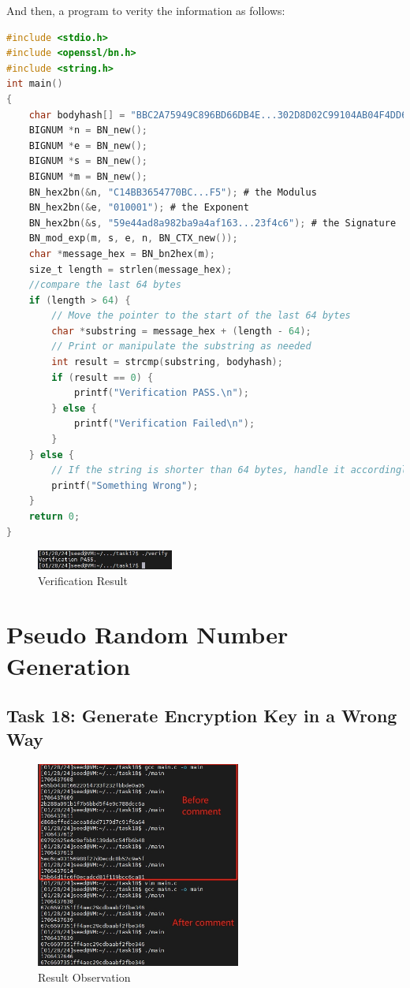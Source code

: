\documentclass[a4paper,11pt]{article}
\begin{document}
And then, a program to verity the information as follows:
\begin{lstlisting}[caption={C Program Code for Manually Verifying},label={lst:task17},language=C,breaklines=true]
#include <stdio.h>
#include <openssl/bn.h>
#include <string.h>
int main()
{
    char bodyhash[] = "BBC2A75949C896BD66DB4E...302D8D02C99104AB04F4DD6"; # the Body HASH
    BIGNUM *n = BN_new();
    BIGNUM *e = BN_new();
    BIGNUM *s = BN_new();
    BIGNUM *m = BN_new();
    BN_hex2bn(&n, "C14BB3654770BC...F5"); # the Modulus
    BN_hex2bn(&e, "010001"); # the Exponent
    BN_hex2bn(&s, "59e44ad8a982ba9a4af163...23f4c6"); # the Signature
    BN_mod_exp(m, s, e, n, BN_CTX_new());
    char *message_hex = BN_bn2hex(m);
    size_t length = strlen(message_hex);
    //compare the last 64 bytes
    if (length > 64) {
        // Move the pointer to the start of the last 64 bytes
        char *substring = message_hex + (length - 64);
        // Print or manipulate the substring as needed
        int result = strcmp(substring, bodyhash);
        if (result == 0) {
            printf("Verification PASS.\n");
        } else {
            printf("Verification Failed\n");
        }
    } else {
        // If the string is shorter than 64 bytes, handle it accordingly
        printf("Something Wrong");
    }
    return 0;
}
\end{lstlisting} 
\begin{figure}[h]
    \centering
       \includegraphics[width=0.4\textwidth]{figures/task17/result.png}
    \caption{Verification Result}\label{fig:task17result}
\end{figure}
\section{Pseudo Random Number Generation}
\subsection{Task 18: Generate Encryption Key in a Wrong Way}
\begin{figure}[h]
    \centering
       \includegraphics[width=0.6\textwidth]{figures/task18/task18.png}
    \caption{Result Observation}\label{fig:task18result}
\end{figure}
\end{document}
